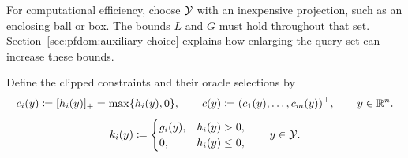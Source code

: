 For computational efficiency, choose $\mathcal{Y}$ with an inexpensive projection,
such as an enclosing ball or box. The bounds $L$ and $G$ must hold
throughout that set.
Section~\ref{sec:pfdom:auxiliary-choice} explains how enlarging the query
set can increase these bounds.

Define the clipped constraints and their oracle selections by
\begin{equation}\label{eq:ch4-cb-clipped-constraints}
c_i(y)\coloneqq[h_i(y)]_+=\max\{h_i(y),0\},\qquad
c(y)\coloneqq(c_1(y),\ldots,c_m(y))^\top,\qquad y\in\mathbb{R}^n.
\end{equation}
\begin{equation}\label{eq:ch4-cb-clipped-subgradients}
k_i(y)\coloneqq
\begin{cases}
g_i(y),&h_i(y)>0,\\
0,&h_i(y)\le0,
\end{cases}
\qquad y\in\mathcal{Y}.
\end{equation}

